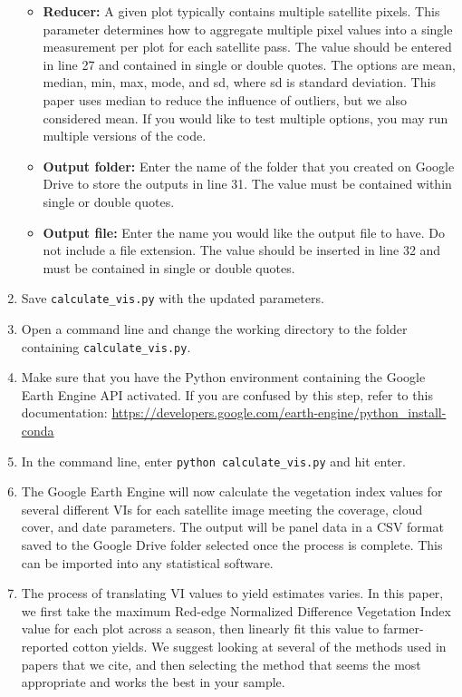\documentclass{article}
\begin{document}
\begin{enumerate}
\begin{itemize}
    \item \textbf{Reducer:} A given plot typically contains multiple satellite pixels. This parameter determines how to aggregate multiple pixel values into a single measurement per plot for each satellite pass. The value should be entered in line 27 and contained in single or double quotes. The options are mean, median, min, max, mode, and sd, where sd is standard deviation. This paper uses median to reduce the influence of outliers, but we also considered mean. If you would like to test multiple options, you may run multiple versions of the code. 
    \item \textbf{Output folder:} Enter the name of the folder that you created on Google Drive to store the outputs in line 31. The value must be contained within single or double quotes. 
    \item \textbf{Output file:} Enter the name you would like the output file to have. Do not include a file extension. The value should be inserted in line 32 and must be contained in single or double quotes.
  \end{itemize}
  \item Save \lstinline[language=Python]{calculate_vis.py} with the updated parameters. 
  \item Open a command line and change the working directory to the folder containing \lstinline[language=Python]{calculate_vis.py}. 
  \item Make sure that you have the Python environment containing the Google Earth Engine API activated. If you are confused by this step, refer to this documentation: \url{https://developers.google.com/earth-engine/python_install-conda}
  \item In the command line, enter \lstinline[language=bash]{python calculate_vis.py} and hit enter. 
  \item The Google Earth Engine will now calculate the vegetation index values for several different VIs for each satellite image meeting the coverage, cloud cover, and date parameters. The output will be panel data in a CSV format saved to the Google Drive folder selected once the process is complete. This can be imported into any statistical software. 
  \item The process of translating VI values to yield estimates varies. In this paper, we first take the maximum Red-edge Normalized Difference Vegetation Index value for each plot across a season, then linearly fit this value to farmer-reported cotton yields. We suggest looking at several of the methods used in papers that we cite, and then selecting the method that seems the most appropriate and works the best in your sample.  

\end{enumerate}
\end{document}
